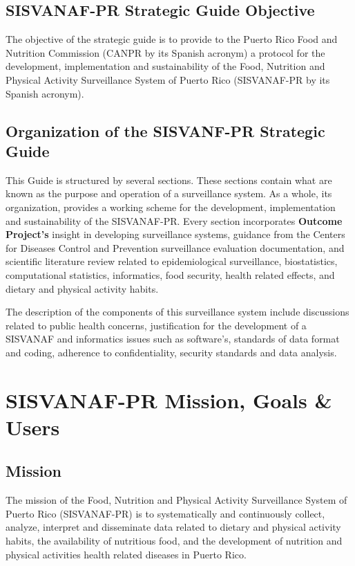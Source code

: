 \documentclass[12pt,letterpaper]{report}
\begin{document}
\subsection{SISVANAF-PR Strategic Guide Objective}

The objective of the strategic guide is to provide to the Puerto Rico Food and Nutrition Commission (CANPR by its Spanish acronym) a protocol for the development, implementation and sustainability of the Food, Nutrition and Physical Activity Surveillance System of Puerto Rico (SISVANAF-PR by its Spanish acronym).

\subsection{Organization of the SISVANF-PR Strategic Guide}

This Guide is structured by several sections. These sections contain what are known as the purpose and operation of a surveillance system. As a whole, its organization, provides a working scheme for the development, implementation and sustainability of the SISVANAF-PR. Every section incorporates \textbf{Outcome Project's} insight in developing surveillance systems, guidance from the Centers for Diseases Control and Prevention surveillance evaluation documentation, and scientific literature review related to epidemiological surveillance, biostatistics, computational statistics, informatics, food security, health related effects, and dietary and physical activity habits.

The description of the components of this surveillance system include discussions related to public health concerns, justification for the development of a SISVANAF and informatics issues such as software's, standards of data format and coding, adherence to confidentiality, security standards and data analysis.

\section{SISVANAF-PR Mission, Goals \& Users}

\subsection{Mission}
The mission of the Food, Nutrition and Physical Activity Surveillance System of Puerto Rico (SISVANAF-PR) is to systematically and continuously collect, analyze, interpret and disseminate data related to dietary and physical activity habits, the availability of nutritious food, and the development of nutrition and physical activities health related diseases in Puerto Rico. 
\end{document}
